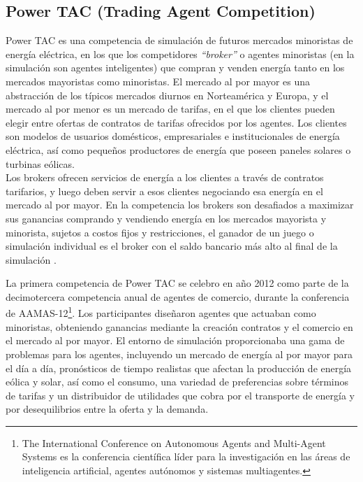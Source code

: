 \subsection{Power TAC (Trading Agent Competition)}

Power TAC es una competencia de simulación de futuros mercados minoristas de energía eléctrica, en los que los competidores \textit{``broker''} o agentes minoristas (en la simulación son agentes inteligentes) que compran y venden energía tanto en los mercados mayoristas como minoristas. 
El mercado al por mayor es una abstracción de los típicos mercados diurnos en Norteamérica y Europa, y el mercado al por menor es un mercado de tarifas, en el que los clientes pueden elegir entre ofertas de contratos de tarifas ofrecidos por los agentes. Los clientes son modelos de usuarios domésticos, empresariales e institucionales de energía eléctrica, así como pequeños productores de energía que poseen paneles solares o turbinas eólicas.\\

Los brokers ofrecen servicios de energía a los clientes a través de contratos tarifarios, y luego deben servir a esos clientes negociando esa energía en el mercado al por mayor. En la competencia los brokers son desafiados a maximizar sus ganancias comprando y vendiendo energía en los mercados mayorista y minorista, sujetos a costos fijos y restricciones, el ganador de un juego o simulación individual es el broker con el saldo bancario más alto al final de la simulación \cite{WKetterJCollinsyMdWeerdtThe2017PowerTAC}.

La primera competencia de Power TAC se celebro en año 2012 como parte de la decimotercera competencia anual de agentes de comercio, durante la conferencia de AAMAS-12\footnote{The International Conference on Autonomous Agents and Multi-Agent Systems es la conferencia científica líder para la investigación en las áreas de inteligencia artificial, agentes autónomos y sistemas multiagentes.}. 
Los participantes diseñaron agentes  que actuaban como minoristas, obteniendo ganancias mediante la creación contratos y el comercio en el mercado al por mayor. 
El entorno  de simulación proporcionaba una gama de problemas para los agentes, incluyendo un mercado de energía al por mayor para el día a día, pronósticos de tiempo realistas que afectan la producción de energía eólica y solar, así como el consumo, una variedad de preferencias sobre términos de tarifas y un distribuidor de utilidades que cobra por el transporte de energía y por desequilibrios entre la oferta y la demanda.\\

